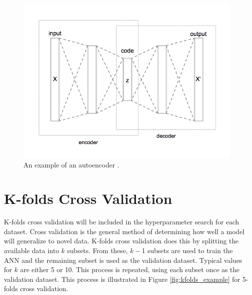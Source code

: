 \documentclass[tocnosub,noragright,centerchapter,12pt,fullpage]{uiucecethesis09}
\begin{document}
\begin{figure}[H]
\centering
\includegraphics[width=0.8\linewidth]{images/Autoencoder_structure}
\caption{An example of an autoencoder \cite{wiki:AutoencoderStructure}.}
\label{fig:Autoencoder_structure}
\end{figure}







\section{K-folds Cross Validation} \label{CrossValidation}

K-folds cross validation will be included in the hyperparameter search for each dataset. Cross validation is the general method of determining how well a model will generalize to novel data. K-folds cross validation does this by splitting the available data into $k$ subsets. From these, $k-$1 subsets are used to train the ANN and the remaining subset is used as the validation dataset. Typical values for $k$ are either 5 or 10. This process is repeated, using each subset once as the validation dataset. This process is illustrated in Figure \ref{fig:kfolds_example} for 5-folds cross validation. 
\end{document}
